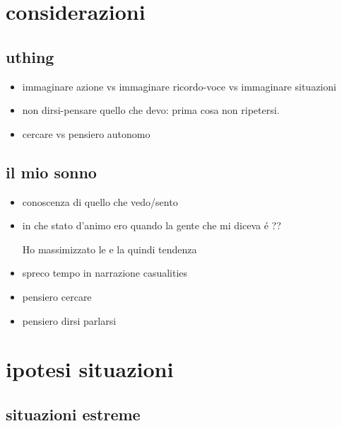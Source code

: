 \section{considerazioni}

\subsection{uthing}

\begin{itemize}

\item immaginare azione vs immaginare ricordo-voce vs immaginare situazioni

\item non dirsi-pensare quello che devo: prima cosa non ripetersi.

\item cercare vs pensiero autonomo

\end{itemize}


\subsection{il mio sonno}

\begin{itemize}

\item conoscenza di quello che vedo/sento

\item in che stato d'animo ero quando  la gente che mi diceva \'e  ?? 

Ho massimizzato le  e la quindi tendenza 

\item spreco tempo in narrazione casualities

\item pensiero cercare

\item pensiero dirsi parlarsi

\end{itemize}


\section{ipotesi situazioni}

\subsection{situazioni estreme}

